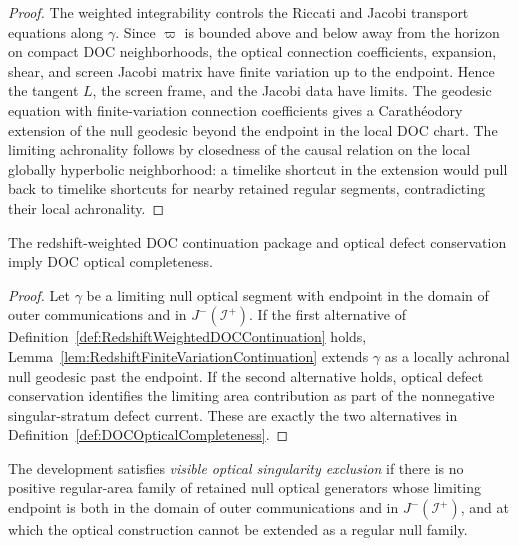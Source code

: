 \begin{proof}
The weighted integrability controls the Riccati and Jacobi transport equations along $\gamma$. Since $\varpi$ is bounded above and below away from the horizon on compact DOC neighborhoods, the optical connection coefficients, expansion, shear, and screen Jacobi matrix have finite variation up to the endpoint. Hence the tangent $L$, the screen frame, and the Jacobi data have limits. The geodesic equation with finite-variation connection coefficients gives a Carath\'eodory extension of the null geodesic beyond the endpoint in the local DOC chart. The limiting achronality follows by closedness of the causal relation on the local globally hyperbolic neighborhood: a timelike shortcut in the extension would pull back to timelike shortcuts for nearby retained regular segments, contradicting their local achronality.
\end{proof}

\begin{theorem}\label{thm:RedshiftDOCOpticalCompleteness}
The redshift-weighted DOC continuation package and optical defect conservation imply DOC optical completeness.
\end{theorem}

\begin{proof}
Let $\gamma$ be a limiting null optical segment with endpoint in the domain of outer communications and in $J^-(\mathscr I^+)$. If the first alternative of Definition~\ref{def:RedshiftWeightedDOCContinuation} holds, Lemma~\ref{lem:RedshiftFiniteVariationContinuation} extends $\gamma$ as a locally achronal null geodesic past the endpoint. If the second alternative holds, optical defect conservation identifies the limiting area contribution as part of the nonnegative singular-stratum defect current. These are exactly the two alternatives in Definition~\ref{def:DOCOpticalCompleteness}.
\end{proof}

\begin{definition}\label{def:VisibleOpticalSingularityExclusion}
The development satisfies \emph{visible optical singularity exclusion} if there is no positive regular-area family of retained null optical generators whose limiting endpoint is both in the domain of outer communications and in $J^-(\mathscr I^+)$, and at which the optical construction cannot be extended as a regular null family.
\end{definition}

